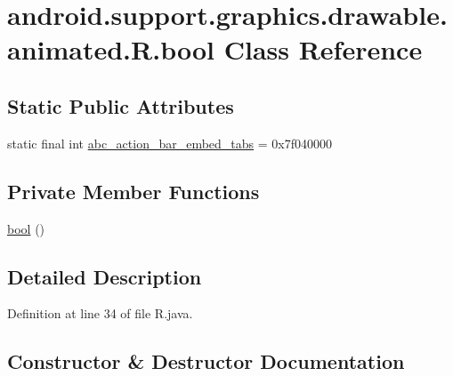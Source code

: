 \hypertarget{classandroid_1_1support_1_1graphics_1_1drawable_1_1animated_1_1_r_1_1bool}{}\section{android.\+support.\+graphics.\+drawable.\+animated.\+R.\+bool Class Reference}
\label{classandroid_1_1support_1_1graphics_1_1drawable_1_1animated_1_1_r_1_1bool}
\subsection*{Static Public Attributes}
\begin{DoxyCompactItemize}
\item 
static final int \mbox{\hyperlink{classandroid_1_1support_1_1graphics_1_1drawable_1_1animated_1_1_r_1_1bool_aa72a93d23c6382aab7e3917f72025bc7}{abc\+\_\+action\+\_\+bar\+\_\+embed\+\_\+tabs}} = 0x7f040000
\end{DoxyCompactItemize}
\subsection*{Private Member Functions}
\begin{DoxyCompactItemize}
\item 
\mbox{\hyperlink{classandroid_1_1support_1_1graphics_1_1drawable_1_1animated_1_1_r_1_1bool_a4754c9056c531917324973f3a161e9af}{bool}} ()
\end{DoxyCompactItemize}


\subsection{Detailed Description}


Definition at line 34 of file R.\+java.



\subsection{Constructor \& Destructor Documentation}
\mbox{\label{classandroid_1_1support_1_1graphics_1_1drawable_1_1animated_1_1_r_1_1bool_a4754c9056c531917324973f3a161e9af}} 

